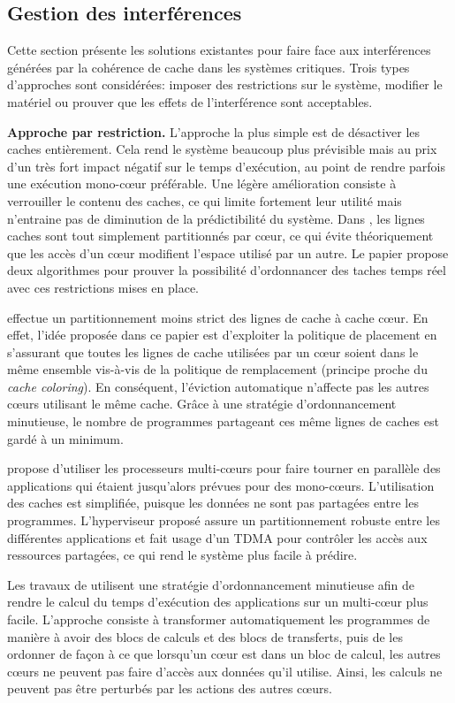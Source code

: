 \subsection{Gestion des interférences}
\label{fr:sec:handling_it}
Cette section présente les solutions existantes pour faire face aux
interférences générées par la cohérence de cache dans les systèmes critiques.
Trois types d'approches sont considérées: imposer des restrictions sur le
système, modifier le matériel ou prouver que les effets de l'interférence sont
acceptables.

\noindent\textbf{Approche par restriction.}
L'approche la plus simple est de désactiver les caches entièrement. Cela rend le
système beaucoup plus prévisible mais au prix d'un très fort impact négatif sur le
temps d'exécution, au point de rendre parfois une exécution mono-cœur préférable. Une
légère amélioration consiste à verrouiller le contenu des caches, ce qui limite
fortement leur utilité mais n'entraine pas de diminution de la prédictibilité
du système.
Dans \cite{10.1145/1629335.1629369}, les lignes caches sont tout simplement
partitionnés par cœur, ce qui évite théoriquement que les accès d'un cœur
modifient l'espace utilisé par un autre. Le papier propose deux algorithmes pour
prouver la possibilité d'ordonnancer des taches temps réel avec ces restrictions
mises en place.

\cite{DBLP:journals/corr/abs-1903-09310} effectue un partitionnement moins
strict des lignes de cache à cache cœur. En effet, l'idée proposée dans ce
papier est d'exploiter la politique de placement en s'assurant que toutes les
lignes de cache utilisées par un cœur soient dans le même ensemble vis-à-vis de
la politique de remplacement (principe proche du \textit{cache coloring}). En
conséquent, l'éviction automatique n'affecte
pas les autres cœurs utilisant le même cache. Grâce à une
stratégie d'ordonnancement minutieuse, le nombre de programmes partageant ces
même lignes de caches est gardé à un minimum.

\cite{jean:tel-01341758} propose d'utiliser les processeurs multi-cœurs pour
faire tourner en parallèle des applications qui étaient jusqu'alors prévues pour
des mono-cœurs. L'utilisation des caches est simplifiée, puisque les données ne
sont pas partagées entre les programmes. L'hyperviseur
proposé assure un partitionnement robuste entre les différentes applications
et fait usage d'un TDMA pour contrôler les accès aux ressources partagées, ce
qui rend le système plus facile à prédire.

Les travaux de \cite{10.1007/978-3-642-28293-5_9} utilisent une stratégie
d'ordonnancement minutieuse afin de rendre le calcul du temps d'exécution des
applications sur un multi-cœur plus facile. L'approche consiste
à transformer
automatiquement les programmes de manière à avoir des blocs de calculs et des
blocs de transferts, puis de les ordonner de façon à ce que lorsqu'un cœur est
dans un bloc de calcul, les autres cœurs ne peuvent pas faire d'accès aux
données qu'il utilise. Ainsi, les calculs ne peuvent pas être perturbés par les
actions des autres cœurs.

